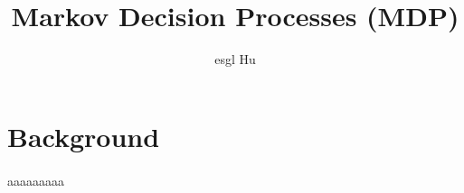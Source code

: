 \documentclass[12pt,a4paper]{article}
\begin{document}
\title{Markov Decision Processes (MDP)}
\author{esgl Hu}
\maketitle
\fi
\section{Background}
\paragraph{}aaaaaaaaa
\ifx\allfiles\undefined
\end{document}
